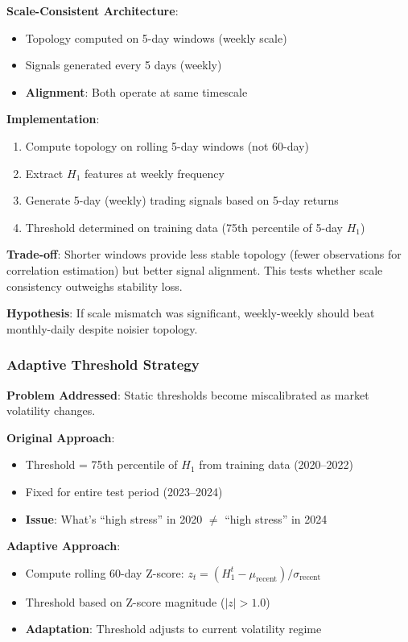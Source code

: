 \textbf{Scale-Consistent Architecture}:
\begin{itemize}
\item Topology computed on 5-day windows (weekly scale)
\item Signals generated every 5 days (weekly)
\item \textbf{Alignment}: Both operate at same timescale
\end{itemize}

\textbf{Implementation}:
\begin{enumerate}
\item Compute topology on rolling 5-day windows (not 60-day)
\item Extract $H_1$ features at weekly frequency
\item Generate 5-day (weekly) trading signals based on 5-day returns
\item Threshold determined on training data (75th percentile of 5-day $H_1$)
\end{enumerate}

\textbf{Trade-off}: Shorter windows provide less stable topology (fewer observations for correlation estimation) but better signal alignment. This tests whether scale consistency outweighs stability loss.

\textbf{Hypothesis}: If scale mismatch was significant, weekly-weekly should beat monthly-daily despite noisier topology.

\subsubsection{Adaptive Threshold Strategy}

\textbf{Problem Addressed}: Static thresholds become miscalibrated as market volatility changes.

\textbf{Original Approach}:
\begin{itemize}
\item Threshold = 75th percentile of $H_1$ from training data (2020--2022)
\item Fixed for entire test period (2023--2024)
\item \textbf{Issue}: What's ``high stress'' in 2020 $\neq$ ``high stress'' in 2024
\end{itemize}

\textbf{Adaptive Approach}:
\begin{itemize}
\item Compute rolling 60-day Z-score: $z_t = (H_1^t - \mu_{\text{recent}}) / \sigma_{\text{recent}}$
\item Threshold based on Z-score magnitude ($|z| > 1.0$)
\item \textbf{Adaptation}: Threshold adjusts to current volatility regime
\end{itemize}

